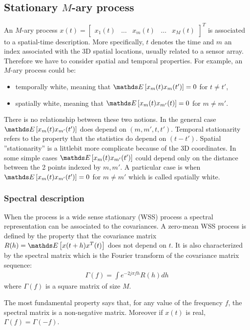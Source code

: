 \subsection{Stationary $M$-ary process}
An $M$-ary process $x(t)=\begin{bmatrix}
x_{1}(t)&\ldots&x_{m}(t)&\ldots&x_{M}(t)
\end{bmatrix}^{T}$ is associated to a spatial-time description. More specifically, $t$ denotes the time and $m$ an index associated with the 3D spatial locations, usually related to a sensor array.  Therefore we have to consider spatial and temporal properties. For example, an $M$-ary process could be:
\begin{itemize}
 \item
temporally white, meaning that $\esp{x_m(t)x_m(t')}=0$ for $t\neq t'$,
\item
spatially white, meaning that $\esp{x_m(t)x_{m'}(t)}=0$ for $m\neq m'$.
\end{itemize} 
There is no relationship between these two notions. In the general case $\esp{x_m(t)x_{m'}(t')}$ does depend on $(m,m',t,t')$. Temporal stationarity refers to the property that the statistics do depend on $(t-t')$. Spatial ''stationarity'' is a littlebit more complicate because of the 3D coordinates. In some simple cases $\esp{x_m(t)x_{m'}(t')}$ could depend only on the distance between the 2 points indexed by $m,m'$. A particular case is when $\esp{x_m(t)x_{m'}(t')}=0$ for $m\neq m'$ which is called spatially white.

\subsubsection{Spectral description}
When the process is a wide sense stationary (WSS) process  a spectral representation can be associated to the covariances. A zero-mean WSS  process is defined by the property that the covariance matrix $R(h)=\esp{x(t+h)x^{T}(t)}$ does not depend on $t$. It is also characterized by the spectral matrix which is the Fourier transform of the covariance matrix sequence:
\begin{eqnarray}
 \Gamma(f) = \int e^{-2j\pi fh}R(h)dh
\end{eqnarray}
where $\Gamma(f)$ is a square matrix of size $M$.

The most fundamental property says that, for any value of the frequency $f$, the spectral matrix is a non-negative matrix. Moreover if $x(t)$ is real, $\Gamma(f)=\Gamma(-f)$.

